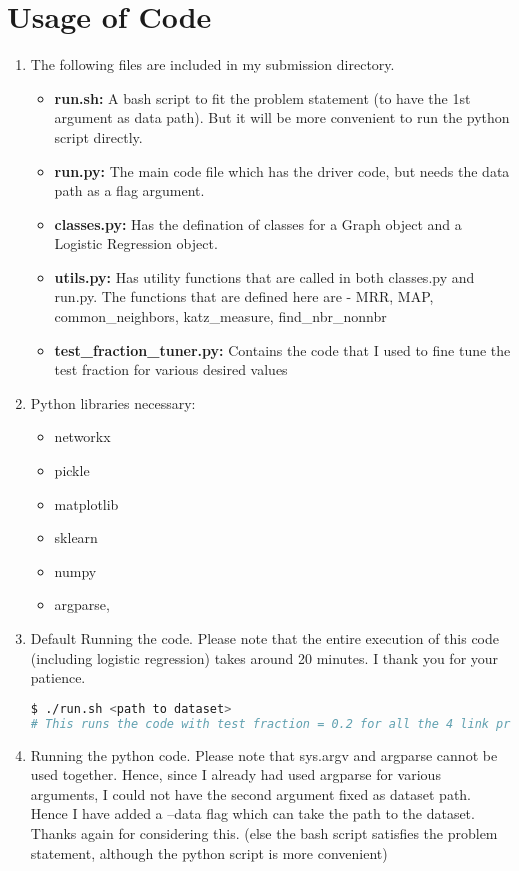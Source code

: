 \documentclass[12pt, a4paper]{article}
\begin{document}
\newpage
\section{Usage of Code}

\begin{enumerate}
\item The following files are included in my submission directory.
	\begin{itemize}
	\item \textbf{run.sh:} A bash script to fit the problem statement (to have the 1st argument as data path). But it will be more convenient to run the python script directly.
	\item \textbf{run.py:} The main code file which has the driver code, but needs the data path as a flag argument.
	\item \textbf{classes.py:} Has the defination of classes for a Graph object and a Logistic Regression object.
	\item \textbf{utils.py:} Has utility functions that are called in both classes.py and run.py. The functions that are defined here are - MRR, MAP, common\_neighbors, katz\_measure, find\_nbr\_nonnbr
	\item \textbf{test\_fraction\_tuner.py:} Contains the code that I used to fine tune the test fraction for various desired values
	\end{itemize}
\item Python libraries necessary:
\begin{itemize}
\setlength\itemsep{0.1pt}
\item networkx
\item pickle
\item matplotlib
\item sklearn
\item numpy
\item argparse,
\end{itemize}
\item Default Running the code. Please note that the entire execution of this code (including logistic regression) takes around 20 minutes. I thank you for your patience. 
\begin{lstlisting}[language=Bash]
$ ./run.sh <path to dataset>
# This runs the code with test fraction = 0.2 for all the 4 link predictors and Logistic Regression.
\end{lstlisting}
\item Running the python code. Please note that sys.argv and argparse cannot be used together. Hence, since I already had used argparse for various arguments, I could not have the second argument fixed as dataset path. Hence I have added a --data flag which can take the path to the dataset. Thanks again for considering this. (else the bash script satisfies the problem statement, although the python script is more convenient)

\end{enumerate}
\end{document}
